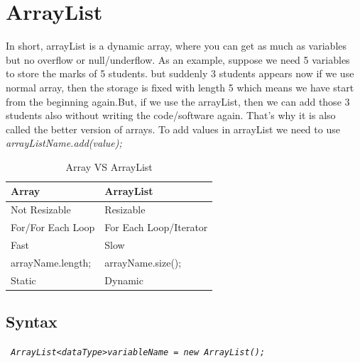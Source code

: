 \documentclass[openany]{book}  %
\begin{document}
\section{ArrayList}
In short, arrayList is a dynamic array, where you can get as much as variables \\
but no overflow or null/underflow. As an example, suppose we need 5 variables \\
to store the marks of 5 students. but suddenly 3 students appears now if we use \\
normal array, then the storage is fixed with length 5 which means we have start \\
from the beginning again.But, if we use the arrayList, then we can add those 3 \\
students also without writing the code/software again. That's why it is also \\
called the better version of arrays. \linebreak
To add values in arrayList we need to use \textit{arrayListName.add(value);}
% 
% 
\begin{table}[htbp]
    \begin{tabular}{|l|l|}
        \hline
        Array             & ArrayList              \\ \hline
        Not Resizable     & Resizable              \\ \hline
        For/For Each Loop & For Each Loop/Iterator \\ \hline
        Fast              & Slow                   \\ \hline
        arrayName.length; & arrayName.size();      \\ \hline
        Static            & Dynamic                \\ \hline
    \end{tabular}
    \centering
    \caption{Array VS ArrayList}
\end{table}
% 
% 
\subsection{Syntax}
\begin{center}
    \tt{
        \textit{ArrayList<dataType>variableName = new ArrayList();}
    }
\end{center}
% 
%
\end{document}
